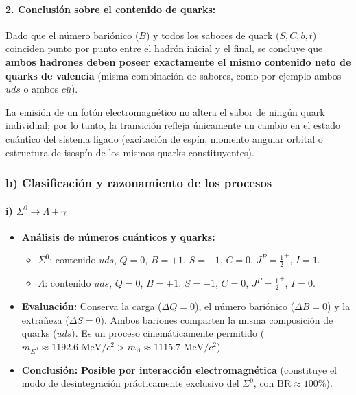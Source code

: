 \begin{problema}
\paragraph{2. Conclusión sobre el contenido de quarks:}
Dado que el número bariónico ($B$) y todos los sabores de quark ($S, C, b, t$) coinciden punto por punto entre el hadrón inicial y el final, se concluye que \textbf{ambos hadrones deben poseer exactamente el mismo contenido neto de quarks de valencia} (misma combinación de sabores, como por ejemplo ambos $uds$ o ambos $c\bar{u}$).

La emisión de un fotón electromagnético no altera el sabor de ningún quark individual; por lo tanto, la transición refleja únicamente un cambio en el estado cuántico del sistema ligado (excitación de espín, momento angular orbital o estructura de isospín de los mismos quarks constituyentes).

\subsubsection*{b) Clasificación y razonamiento de los procesos}

\paragraph{i) $\Sigma^0 \longrightarrow \Lambda + \gamma$}
\begin{itemize}
    \item \textbf{Análisis de números cuánticos y quarks:}
    \begin{itemize}
        \item $\Sigma^0$: contenido $uds$, $Q=0$, $B=+1$, $S=-1$, $C=0$, $J^P = \frac{1}{2}^+$, $I=1$.
        \item $\Lambda$: contenido $uds$, $Q=0$, $B=+1$, $S=-1$, $C=0$, $J^P = \frac{1}{2}^+$, $I=0$.
    \end{itemize}
    \item \textbf{Evaluación:} Conserva la carga ($\Delta Q = 0$), el número bariónico ($\Delta B = 0$) y la extrañeza ($\Delta S = 0$). Ambos bariones comparten la misma composición de quarks ($uds$). Es un proceso cinemáticamente permitido ($m_{\Sigma^0} \approx 1192.6\text{ MeV}/c^2 > m_\Lambda \approx 1115.7\text{ MeV}/c^2$).
    \item \textbf{Conclusión:} \textbf{Posible por interacción electromagnética} (constituye el modo de desintegración prácticamente exclusivo del $\Sigma^0$, con $\text{BR} \approx 100\%$).
\end{itemize}


\end{problema}
